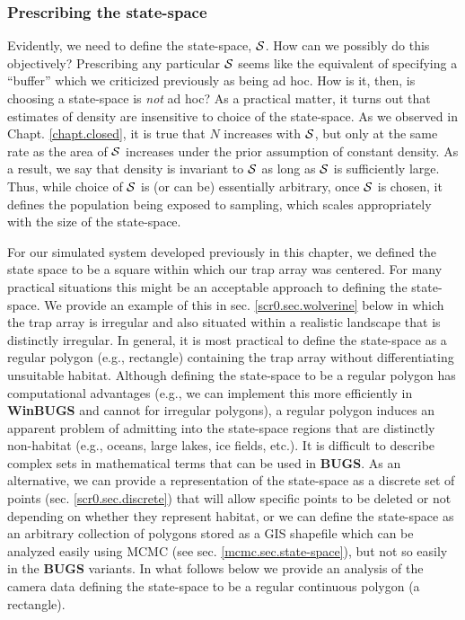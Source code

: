 \subsubsection{Prescribing the state-space}

Evidently, we need to define the state-space, ${\cal S}$. How can we
possibly do this objectively? Prescribing any particular ${\cal S}$
seems like the equivalent of specifying a ``buffer'' which we
criticized previously as being ad hoc. How is it, then, is choosing a
state-space is {\it not} ad hoc? As a practical matter, it turns out
that estimates of density are insensitive to choice of the
state-space. As we observed in Chapt. \ref{chapt.closed}, it is true that $N$ increases
with ${\cal S}$, but only at the same rate as the area of ${\cal S}$
increases under the
prior assumption of constant density. As a result, we say that density
is invariant to ${\cal S}$ as long as ${\cal S}$ is sufficiently
large. Thus, while choice of ${\cal S}$ is (or can be) essentially
arbitrary, once ${\cal S}$ is chosen, it defines the population being
exposed to sampling, which scales appropriately with the size of the
state-space.

For our simulated system developed previously in this chapter, we
defined the state space to be a square within which our trap array was
centered. For many practical situations this might be an
acceptable approach to defining the state-space. We provide an example
of this in sec. \ref{scr0.sec.wolverine} below in which the trap array is
irregular and also situated within a realistic landscape that is
distinctly irregular.  In general, it is most practical to define the
state-space as a regular polygon (e.g., rectangle) containing the trap
array without differentiating unsuitable habitat. Although defining
the state-space to be a regular polygon has computational advantages
(e.g., we can implement this more efficiently in {\bf WinBUGS} and
cannot for irregular polygons), a regular polygon induces an apparent
problem of admitting into the state-space regions that are distinctly
non-habitat (e.g., oceans, large lakes, ice fields, etc.).  It is
difficult to describe complex sets in mathematical terms that can be
used in {\bf BUGS}. As an alternative, we can provide a
representation of the state-space as a discrete set of points (sec.
\ref{scr0.sec.discrete}) that will allow specific points to be deleted
or not depending on whether they represent habitat, or we can define
the state-space as an arbitrary  collection of polygons stored as a GIS
shapefile
which can be analyzed easily using MCMC
(see sec. \ref{mcmc.sec.state-space}), but not so easily in the {\bf
  BUGS} variants.  In what follows below we provide an
analysis of the camera data defining the state-space to be a regular
continuous polygon (a rectangle).



